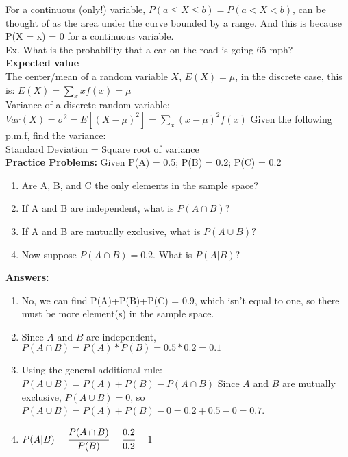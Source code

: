 \documentclass[12pt]{article}
\begin{document}
For a continuous (only!) variable, $P(a \leq X \leq b) = P(a < X < b)$, can be thought of as the area under the curve bounded by a range. And this is because P(X = x) = 0 for a continuous variable.\\

Ex. What is the probability that a car on the road is going 65 mph?\\

\noindent \textbf{Expected value} \\

The center/mean of a random variable $X$, $E(X) = \mu$, in the discrete case, this is: $E(X) = \sum_{x} xf(x) = \mu$ \\

Variance of a discrete random variable: $Var(X) = \sigma^2 = E[(X -\mu)^2] = \sum_x (x - \mu)^2f(x)$ Given the following p.m.f, find the variance:\\

Standard Deviation = Square root of variance\\

\noindent \textbf{Practice Problems:}
Given P(A) = 0.5; P(B) = 0.2; P(C) = 0.2
\begin{enumerate}
\item Are A, B, and C the only elements in the sample space?
\item If A and B are independent, what is $P(A \cap B)?$
\item If A and B are mutually exclusive, what is $P(A \cup B)?$
\item Now suppose $P(A \cap B) = 0.2$. What is $P(A|B)?$

\end{enumerate}

\noindent \textbf{Answers:}
\begin{enumerate}
\item No, we can find P(A)+P(B)+P(C) = 0.9, which isn't equal to one, so there must be more element(s) in the sample space. 
\item Since $A$ and $B$ are independent, $P(A \cap B) = P(A)*P(B) = 0.5*0.2 = 0.1$
\item Using the general additional rule: $P(A \cup B) = P(A) + P(B) - P(A\cap B)$ 
Since $A$ and $B$ are mutually exclusive, $P(A \cup B) = 0$, so $P(A \cup B) = P(A) + P(B) - 0 = 0.2 + 0.5 -0 = 0.7$. 
\item $P(A|B) = \cfrac{P(A \cap B)}{P(B)} = \cfrac{0.2}{0.2} = 1$
\end{enumerate}
\end{document}
